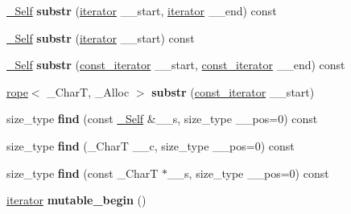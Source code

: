 \begin{DoxyCompactItemize}
\item 
\mbox{\label{classrope_a8309b5fd0218d81ff6e47c39f679ace4}} 
\hyperlink{classrope}{\+\_\+\+Self} {\bfseries substr} (\hyperlink{class___rope__iterator}{iterator} \+\_\+\+\_\+start, \hyperlink{class___rope__iterator}{iterator} \+\_\+\+\_\+end) const
\item 
\mbox{\label{classrope_a845db6671b8665de287442b52cafae2f}} 
\hyperlink{classrope}{\+\_\+\+Self} {\bfseries substr} (\hyperlink{class___rope__iterator}{iterator} \+\_\+\+\_\+start) const
\item 
\mbox{\label{classrope_a9852ebf675c3bb7a8eb099d506293986}} 
\hyperlink{classrope}{\+\_\+\+Self} {\bfseries substr} (\hyperlink{class___rope__const__iterator}{const\+\_\+iterator} \+\_\+\+\_\+start, \hyperlink{class___rope__const__iterator}{const\+\_\+iterator} \+\_\+\+\_\+end) const
\item 
\mbox{\label{classrope_afe8e5a45ca1e96c84ec2a0e876f747d4}} 
\hyperlink{classrope}{rope}$<$ \+\_\+\+CharT, \+\_\+\+Alloc $>$ {\bfseries substr} (\hyperlink{class___rope__const__iterator}{const\+\_\+iterator} \+\_\+\+\_\+start)
\item 
\mbox{\label{classrope_a16406f812147505ed700d6e02d6a6262}} 
size\+\_\+type {\bfseries find} (const \hyperlink{classrope}{\+\_\+\+Self} \&\+\_\+\+\_\+s, size\+\_\+type \+\_\+\+\_\+pos=0) const
\item 
\mbox{\label{classrope_a6ecf206315c34a7e375518318936df31}} 
size\+\_\+type {\bfseries find} (\+\_\+\+CharT \+\_\+\+\_\+c, size\+\_\+type \+\_\+\+\_\+pos=0) const
\item 
\mbox{\label{classrope_a0a252bcfe5e08d4780638700c7ca4405}} 
size\+\_\+type {\bfseries find} (const \+\_\+\+CharT $\ast$\+\_\+\+\_\+s, size\+\_\+type \+\_\+\+\_\+pos=0) const
\item 
\mbox{\label{classrope_aaf99baaad7b30641b5ecddd3853b30d4}} 
\hyperlink{class___rope__iterator}{iterator} {\bfseries mutable\+\_\+begin} ()
\item 
\mbox{\label{classrope_adebece1ef53913fd916449d37dad685d}} 

\end{DoxyCompactItemize}
